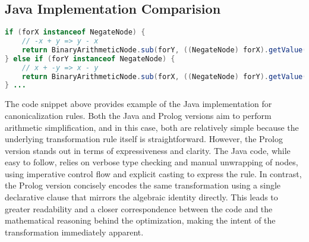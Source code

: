 \subsection*{Java Implementation Comparision}
\begin{lstlisting}[language=Java]
if (forX instanceof NegateNode) {
    // -x + y => y - x
    return BinaryArithmeticNode.sub(forY, ((NegateNode) forX).getValue(), view);
} else if (forY instanceof NegateNode) {
    // x + -y => x - y
    return BinaryArithmeticNode.sub(forX, ((NegateNode) forY).getValue(), view);
} ...
\end{lstlisting}

The code snippet above provides example of the Java implementation for canonicalization rules.
Both the Java and Prolog versions aim to perform arithmetic simplification, and in this case, both are relatively simple because the underlying transformation rule itself is straightforward. 
However, the Prolog version stands out in terms of expressiveness and clarity. The Java code, while easy to follow, relies on verbose type checking and manual unwrapping of nodes, using imperative control flow and explicit casting to express the rule. In contrast, the Prolog version concisely encodes the same transformation using a single declarative clause that mirrors the algebraic identity directly. This leads to greater readability and a closer correspondence between the code and the mathematical reasoning behind the optimization, making the intent of the transformation immediately apparent.